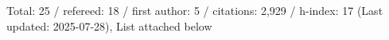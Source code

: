 Total: 25 / refereed: 18 / first author: 5 / citations: 2,929 / h-index: 17 (Last updated: 2025-07-28), List attached below